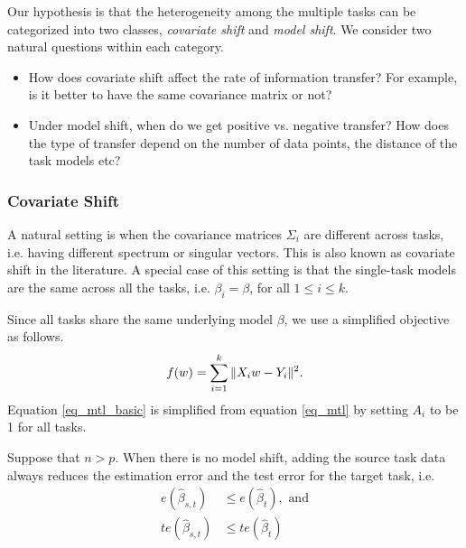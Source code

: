 Our hypothesis is that the heterogeneity among the multiple tasks can be categorized into two classes, \textit{covariate shift} and \textit{model shift}. %
We consider two natural questions within each category.
\begin{itemize}
	\item How does covariate shift affect the rate of information transfer? For example, is it better to have the same covariance matrix or not?
	\item Under model shift, when do we get positive vs. negative transfer? How does the type of transfer depend on the number of data points, the distance of the task models etc?
\end{itemize}



\subsubsection{Covariate Shift}

A natural setting is when the covariance matrices $\Sigma_i$ are different across tasks, i.e. having different spectrum or singular vectors.
This is also known as covariate shift in the literature.
A special case of this setting is that the single-task models are the same across all the tasks, i.e. $\beta_i = \beta$, for all $1\le i\le k$.

Since all tasks share the same underlying model $\beta$, we use a simplified objective as follows.
\begin{align}
	\label{eq_mtl_basic}
	f(w) = \sum_{i=1}^k \|X_i w - Y_i\|^2.
\end{align}
Equation \eqref{eq_mtl_basic} is simplified from equation \eqref{eq_mtl} by setting $A_i$ to be 1 for all tasks. %

\begin{proposition}\label{prop_monotone}
	Suppose that $n > p$.
  When there is no model shift, adding the source task data always reduces the estimation error and the test error for the target task, i.e.
	\begin{align}
		e(\hat{\beta}_{s,t})  &\le e(\hat{\beta}_t), \text{ and} \label{eq_mono_e}\\
		te(\hat{\beta}_{s,t}) &\le te(\hat{\beta}_t) \label{eq_mono_te}
	\end{align}
\end{proposition}

